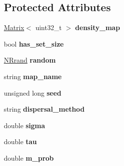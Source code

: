 \subsection*{Protected Attributes}
\begin{DoxyCompactItemize}
\item 
\hyperlink{class_matrix}{Matrix}$<$ uint32\+\_\+t $>$ {\bfseries density\+\_\+map}\hypertarget{class_simulate_dispersal_aa699133749e7a30f225cb355f95f51e6}{}\label{class_simulate_dispersal_aa699133749e7a30f225cb355f95f51e6}

\item 
bool {\bfseries has\+\_\+set\+\_\+size}\hypertarget{class_simulate_dispersal_aff72c923e8454470b2d4c8935061fb21}{}\label{class_simulate_dispersal_aff72c923e8454470b2d4c8935061fb21}

\item 
\hyperlink{class_n_rrand}{N\+Rrand} {\bfseries random}\hypertarget{class_simulate_dispersal_a5f6389fc4116b52622a900c55532f86b}{}\label{class_simulate_dispersal_a5f6389fc4116b52622a900c55532f86b}

\item 
string {\bfseries map\+\_\+name}\hypertarget{class_simulate_dispersal_af1dc4cf60a69aafc2be4c80b0e9228c2}{}\label{class_simulate_dispersal_af1dc4cf60a69aafc2be4c80b0e9228c2}

\item 
unsigned long {\bfseries seed}\hypertarget{class_simulate_dispersal_af9ab2fa8b2c3e1bb1ba49b31679ae0d7}{}\label{class_simulate_dispersal_af9ab2fa8b2c3e1bb1ba49b31679ae0d7}

\item 
string {\bfseries dispersal\+\_\+method}\hypertarget{class_simulate_dispersal_aedabf3440f475bc15d4b95f9e8500d94}{}\label{class_simulate_dispersal_aedabf3440f475bc15d4b95f9e8500d94}

\item 
double {\bfseries sigma}\hypertarget{class_simulate_dispersal_ad6d6ae35911ed2bd045bf8e5bb30b628}{}\label{class_simulate_dispersal_ad6d6ae35911ed2bd045bf8e5bb30b628}

\item 
double {\bfseries tau}\hypertarget{class_simulate_dispersal_aa195b7e1b697c93e85a923eea5fabccc}{}\label{class_simulate_dispersal_aa195b7e1b697c93e85a923eea5fabccc}

\item 
double {\bfseries m\+\_\+prob}\hypertarget{class_simulate_dispersal_ae4b679b39467170abf45845d4591e6db}{}\label{class_simulate_dispersal_ae4b679b39467170abf45845d4591e6db}


\end{DoxyCompactItemize}
